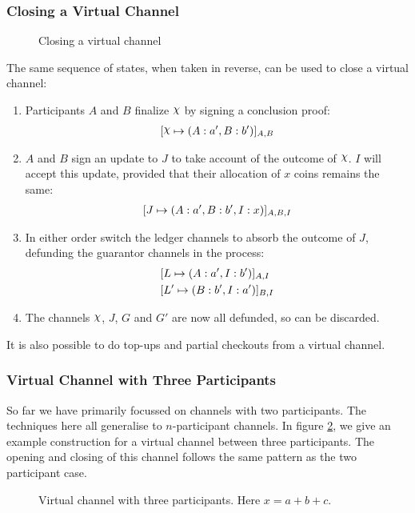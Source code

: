 \subsubsection{Closing a Virtual Channel}

\begin{figure}[ht]\centering
  \makebox[\textwidth][c]{}
  \caption{Closing a virtual channel}
  \label{fig:virtual-channel-closing}
\end{figure}

The same sequence of states, when taken in reverse, can be used to close a virtual channel:
\begin{enumerate}
  \item Participants $A$ and $B$ finalize $\rchi$ by signing a conclusion proof:
  \begin{align}
    \finalizable{\rchi}{\alloc{A:a', B:b'}}{A,B}
  \end{align}
  \item $A$ and $B$ sign an update to $J$ to take account of the outcome of $\rchi$. $I$ will accept this update, provided that their allocation of $x$ coins remains the same:
  \begin{align}
    [J \mapsto ( A: a', B:b', I: x )]_{A, B, I}
  \end{align}
  \item In either order switch the ledger channels to absorb the outcome of $J$, defunding the guarantor channels in the process:
  \begin{align}
    & [L \mapsto ( A: a', I: b' )]_{A,I} \\
    & [L' \mapsto ( B: b', I: a' )]_{B,I}
  \end{align}
  \item The channels $\rchi$, $J$, $G$ and $G'$ are now all defunded, so can be discarded.
\end{enumerate}

It is also possible to do top-ups and partial checkouts from a virtual channel.

\subsubsection{Virtual Channel with Three Participants}

So far we have primarily focussed on channels with two participants.
The techniques here all generalise to $n$-participant channels.
In figure \ref{fig:virtual-channel-three-participants}, we give an example construction for a virtual channel between three participants.
The opening and closing of this channel follows the same pattern as the two participant case.

\begin{figure}[ht] \centering
  \makebox[\textwidth][c]{}
  \caption{Virtual channel with three participants. Here $x = a + b + c$.}
  \label{fig:virtual-channel-three-participants}
\end{figure}
